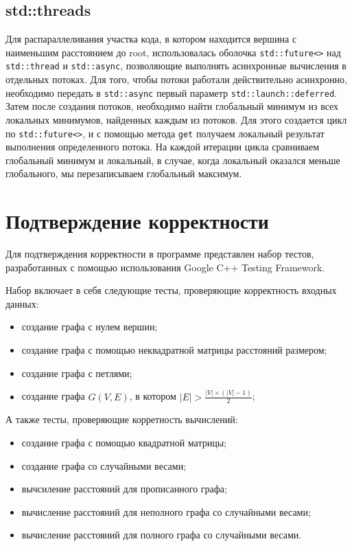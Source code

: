\documentclass{report}
\begin{document}
\subsection*{std::threads}
Для распараллеливания участка кода, в котором находится вершина с наименьшим расстоянием до root, использовалась оболочка \verb|std::future<>| над \verb|std::thread| и \verb|std::async|, позволяющие выполнять асинхронные вычисления в отдельных потоках. Для того, чтобы потоки работали действительно асинхронно, необходимо передать в \verb|std::async| первый параметр \verb|std::launch::deferred|. Затем после создания потоков, необходимо найти глобальный минимум из всех локальных минимумов, найденных каждым из потоков. Для этого создается цикл по \verb|std::future<>|, и с помощью метода \verb|get| получаем локальный результат выполнения определенного потока. На каждой итерации цикла сравниваем глобальный минимум и локальный, в случае, когда локальный оказался меньше глобального, мы перезаписываем глобальный максимум.


\newpage


\section*{Подтверждение корректности}
Для подтверждения корректности в программе представлен набор тестов, разработанных с помощью использования Google C++ Testing Framework.
\par Набор включает в себя следующие тесты, проверяющие корректность входных данных:
\begin{itemize}
\item создание графа с нулем вершин;
\item создание графа с помощью неквадратной матрицы расстояний размером;
\item создание графа с петлями;
\item создание графа $G(V,E)$, в котором $|E| >  \frac{|V| \times \left(|V| - 1\right)}{2}$;
\end{itemize}
 
\par А также тесты, проверяющие корретность вычислений:
\begin{itemize}
\item создание графа с помощью квадратной матрицы;
\item создание графа со случайными весами;
\item вычсиление расстояний для прописанного графа;
\item вычисление расстояний для неполного графа со случайными весами;
\item вычисление расстояний для полного графа со случайными весами.
\end{itemize}
\end{document}
